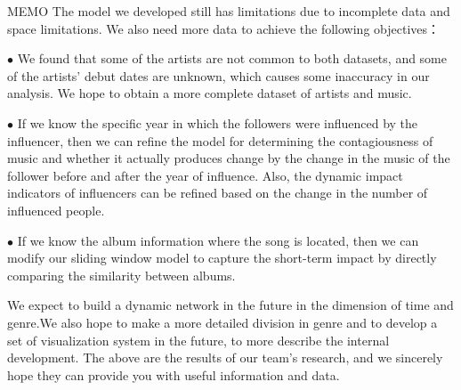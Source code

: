 \documentclass[12pt]{article}  %
\begin{document}
\begin{letter}{MEMO\centering}
The model we developed still has limitations due to incomplete data and space limitations. We also need more data to achieve the following objectives：

$\bullet$ We found that some of the artists are not common to both datasets, and some of the artists' debut dates are unknown, which causes some inaccuracy in our analysis. We hope to obtain a more complete dataset of artists and music.

$\bullet$ If we know the specific year in which the followers were influenced by the influencer, then we can refine the model for determining the contagiousness of music and whether it actually produces change by the change in the music of the follower before and after the year of influence. Also, the dynamic impact indicators of influencers can be refined based on the change in the number of influenced people.

$\bullet$ If we know the album information where the song is located, then we can modify our sliding window model to capture the short-term impact by directly comparing the similarity between albums.

We expect to build a  dynamic network in the future in the dimension of time and genre.We also hope to make a more detailed division in genre and to develop a set of visualization system in the future, to more describe the internal development. The above are the results of our team's research, and we sincerely hope they can provide you with useful information and data.
	 
\end{letter}



%	
%	

\end{document}
